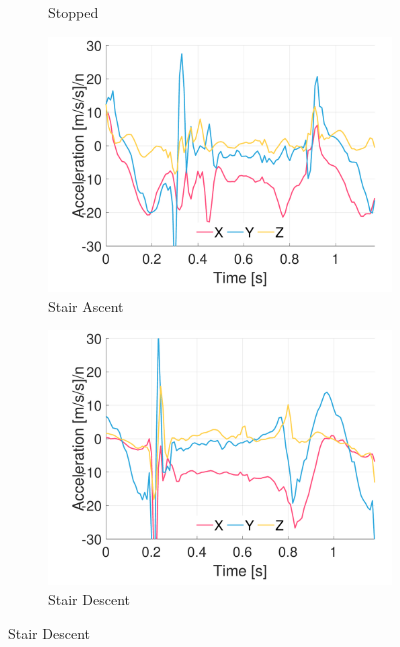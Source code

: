 \begin{figure}[p]
\begin{subfigure}[b]{0.49\textwidth}
         \caption{Stopped}
    \end{subfigure}
    
    \begin{subfigure}[b]{0.49\textwidth}
         \centering
         \includegraphics[width=\textwidth]{content/3-Methods/example-data/ch3_example_data_subject_01_l_ankle_accel_activity_stair_down.pdf}
         \caption{Stair Ascent}
    \end{subfigure}
    \begin{subfigure}[b]{0.49\textwidth}
         \centering
         \includegraphics[width=\textwidth]{content/3-Methods/example-data/ch3_example_data_subject_01_l_ankle_accel_activity_stair_up.pdf}
         \caption{Stair Descent}
    \end{subfigure}
    

\end{figure}
